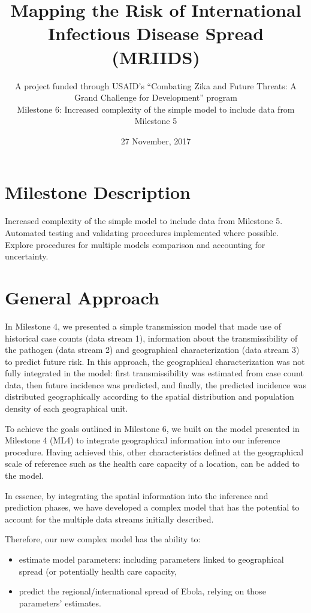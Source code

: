 \documentclass[11pt,]{article}
\title{Mapping the Risk of International Infectious Disease Spread
    (MRIIDS)}
\subtitle{A project funded through USAID’s ``Combating Zika and
    Future Threats: A Grand Challenge for Development'' program \\
    Milestone 6: Increased complexity of the simple model to include data from Milestone 5}
\author{}
\date{27 November, 2017}
\begin{document}
\maketitle
\tableofcontents

\newpage
\section{Milestone Description}\label{milestone-description}

Increased complexity of the simple model to include data from Milestone
5. Automated testing and validating procedures implemented where
possible. Explore procedures for multiple models comparison and accounting for
uncertainty.

\section{General Approach}

In Milestone 4, we presented a simple transmission model that made use of
historical case counts (data stream 1), information about the
transmissibility of the pathogen (data stream 2) and geographical
characterization (data stream 3) to predict future risk. 
In this approach, the geographical characterization was not fully integrated in the model:
first transmissibility was estimated from case count data, then future incidence was predicted, and 
finally, the predicted incidence was distributed geographically according to the spatial distribution 
and population density of each geographical unit.

To achieve the goals outlined in Milestone 6, we built on the model presented in Milestone 4 
(ML4) to integrate geographical information into our inference procedure.
Having achieved this, other characteristics defined at the geographical
scale of reference such as the health care capacity of a location, can be 
added to the model.

In essence, by integrating the spatial information into the inference
and prediction phases, we have developed a complex model that has the potential to
account for the multiple data streams initially described.

Therefore, our new complex model has the ability to:
\begin{itemize}
\item estimate model parameters: including parameters linked to geographical spread (or
potentially health care capacity,
\item predict the regional/international spread of Ebola, relying on those parameters' estimates. 
\end{itemize}
\end{document}
